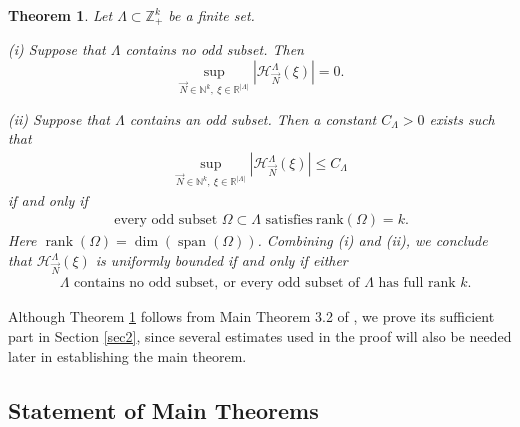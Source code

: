\documentclass[11 pt,letterpaper]{amsart}
\theoremstyle{plain}
\newtheorem{theorem}{Theorem}\numberwithin{theorem}{section}
\theoremstyle{definition}
\theoremstyle{remark} \theoremstyle{exam} \theoremstyle{ob}
\numberwithin{equation}{section}
\begin{document}
\begin{theorem}\label{thji}
	Let $\Lambda\subset \mathbb{Z}_+^k$ be a finite set.
	
	\medskip
	\noindent
	{\rm (i)} Suppose that $\Lambda$ contains no odd subset. Then
	\[
	\sup_{\vec{N}\in \mathbb{N}^{k},\ \xi\in\mathbb{R}^{|\Lambda|}}
	|\mathcal{H}^{\Lambda}_{\vec{N}}(\xi)| =0.
	\]
	
	\medskip
	\noindent
	{\rm (ii)} Suppose that $\Lambda$ contains an odd subset. Then  a constant $C_{\Lambda}>0 $ exists such that
	\begin{align*}
		\sup_{\vec{N}\in \mathbb{N}^k,\ \xi\in\mathbb{R}^{|\Lambda|}}
		\left| \mathcal{H}^{\Lambda}_{\vec{N}}(\xi)\right|
		\le C_{\Lambda}
	\end{align*}
	if and only if 
	\begin{align}\label{v16}
		\ \text{every odd subset $\Omega\subset \Lambda$ satisfies}\ 
		\mathrm{rank}(\Omega)=k .
	\end{align}
	Here $\operatorname{rank}(\Omega)=\dim(\operatorname{span}(\Omega))$.
	Combining {\rm(i)} and {\rm(ii)},  we  conclude that 
	$\mathcal H^\Lambda_{\vec N}(\xi)$
	is uniformly bounded  if and only if either
	\begin{align*}
		&\text{$\Lambda$ contains no odd subset},
		\ \text{or every odd subset of }\Lambda\text{ has full rank }k.
	\end{align*}
	
	
\end{theorem}


Although Theorem \ref{thji} follows from Main Theorem 3.2 of \cite{K}, we prove its sufficient part in Section \ref{sec2}, since
several estimates used in the proof will also be needed later in
establishing the main theorem.





\subsection{Statement of Main Theorems}
\end{document}

